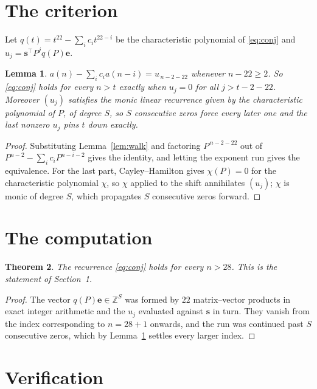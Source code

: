 \documentclass[11pt,a4paper]{article}
\theoremstyle{plain}
\newtheorem{theorem}{Theorem}
\newtheorem{lemma}[theorem]{Lemma}
\theoremstyle{definition}
\begin{document}
\section{The criterion}

Let $q(t)=t^{22}-\sum_i c_i t^{22-i}$ be the characteristic polynomial of
\eqref{eq:conj} and $u_j=\mathbf{s}^{\!\top}P^{j}q(P)\mathbf{e}$.

\begin{lemma}\label{lem:crit}
$a(n)-\sum_i c_i a(n-i)=u_{\,n-2-22}$ whenever $n-22\ge2$. So \eqref{eq:conj}
holds for every $n>t$ exactly when $u_j=0$ for all $j>t-2-22$. Moreover $(u_j)$
satisfies the monic linear recurrence given by the characteristic polynomial of $P$, of
degree $S$, so $S$ consecutive zeros force every later one and the last nonzero $u_j$ pins
$t$ down exactly.
\end{lemma}

\begin{proof}
Substituting Lemma~\ref{lem:walk} and factoring $P^{\,n-2-22}$ out of
$P^{n-2}-\sum_i c_i P^{n-i-2}$ gives the identity, and letting the exponent run gives the
equivalence. For the last part, Cayley--Hamilton gives $\chi(P)=0$ for the characteristic
polynomial $\chi$, so $\chi$ applied to the shift annihilates $(u_j)$; $\chi$ is monic of
degree $S$, which propagates $S$ consecutive zeros forward.
\end{proof}

\section{The computation}

\begin{theorem}
The recurrence \eqref{eq:conj} holds for every $n>28$. This is the statement of
Section~1.
\end{theorem}

\begin{proof}
The vector $q(P)\mathbf{e}\in\mathbb{Z}^{S}$ was formed by $22$ matrix--vector
products in exact integer arithmetic and the $u_j$ evaluated against $\mathbf{s}$ in turn.
They vanish from the index corresponding to $n=28+1$ onwards, and the run was continued
past $S$ consecutive zeros, which by Lemma~\ref{lem:crit} settles every larger index.
\end{proof}

\section{Verification}
\end{document}
